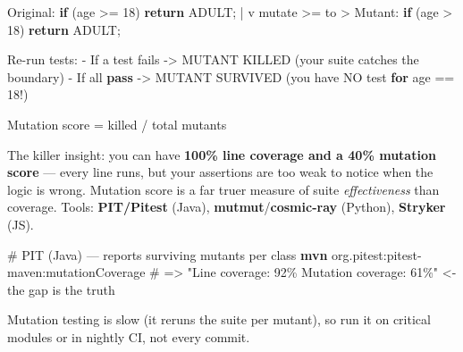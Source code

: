 \documentclass[11pt]{article}
\newenvironment{Shaded}{\begin{snugshade}}{\end{snugshade}}
\newcommand{\BuiltInTok}[1]{\textcolor[rgb]{0.50,0.55,0.55}{#1}}
\newcommand{\CommentTok}[1]{\textcolor[rgb]{0.48,0.49,0.49}{#1}}
\newcommand{\ControlFlowTok}[1]{\textcolor[rgb]{0.99,0.74,0.29}{\textbf{#1}}}
\newcommand{\DecValTok}[1]{\textcolor[rgb]{0.96,0.45,0.00}{#1}}
\newcommand{\ExtensionTok}[1]{\textcolor[rgb]{0.00,0.60,1.00}{\textbf{#1}}}
\newcommand{\NormalTok}[1]{\textcolor[rgb]{0.81,0.81,0.76}{#1}}
\newcommand{\OperatorTok}[1]{\textcolor[rgb]{0.81,0.81,0.76}{#1}}
\begin{document}

\begin{Shaded}
\begin{Highlighting}[]
\NormalTok{   Original:   }\ControlFlowTok{if}\NormalTok{ (age }\OperatorTok{\textgreater{}=} \DecValTok{18}\NormalTok{)  }\ControlFlowTok{return}\NormalTok{ ADULT}\OperatorTok{;}
                       \OperatorTok{|}
\NormalTok{                       v   mutate }\OperatorTok{\textgreater{}=}\NormalTok{ to }\OperatorTok{\textgreater{}}
\NormalTok{   Mutant:     }\ControlFlowTok{if}\NormalTok{ (age }\OperatorTok{\textgreater{}} \DecValTok{18}\NormalTok{)   }\ControlFlowTok{return}\NormalTok{ ADULT}\OperatorTok{;}

\NormalTok{   Re}\OperatorTok{{-}}\NormalTok{run tests:}
     \OperatorTok{{-}}\NormalTok{ If a test fails }\OperatorTok{{-}\textgreater{}}\NormalTok{ MUTANT KILLED  (your suite catches the boundary)}
     \OperatorTok{{-}}\NormalTok{ If }\BuiltInTok{all} \ControlFlowTok{pass}     \OperatorTok{{-}\textgreater{}}\NormalTok{ MUTANT SURVIVED (you have NO test }\ControlFlowTok{for}\NormalTok{ age }\OperatorTok{==} \DecValTok{18}\OperatorTok{!}\NormalTok{)}

\NormalTok{   Mutation score }\OperatorTok{=}\NormalTok{ killed }\OperatorTok{/}\NormalTok{ total mutants}
\end{Highlighting}
\end{Shaded}

The killer insight: you can have \textbf{100\% line coverage and a 40\% mutation score} --- every line runs, but your assertions are too weak to notice when the logic is wrong. Mutation score is a far truer measure of suite \emph{effectiveness} than coverage. Tools: \textbf{PIT/Pitest} (Java), \textbf{mutmut}/\textbf{cosmic-ray} (Python), \textbf{Stryker} (JS).


\begin{Shaded}
\begin{Highlighting}[]
\CommentTok{\# PIT (Java) — reports surviving mutants per class}
\ExtensionTok{mvn}\NormalTok{ org.pitest:pitest{-}maven:mutationCoverage}
\CommentTok{\# =\textgreater{} "Line coverage: 92\%   Mutation coverage: 61\%"  \textless{}{-} the gap is the truth}
\end{Highlighting}
\end{Shaded}

Mutation testing is slow (it reruns the suite per mutant), so run it on critical modules or in nightly CI, not every commit.
\end{document}
